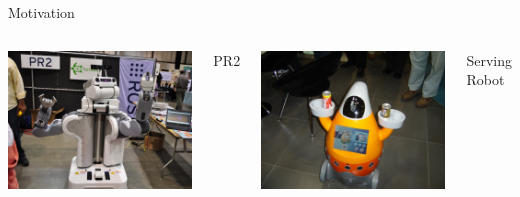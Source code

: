 \documentclass[compress]{beamer}
\begin{document}
\begin{frame}{Motivation}

\begin{columns}[t]
  \includegraphics[width=\textwidth]{figures/extra/PR2.jpg}

  \centering
  PR2

  \includegraphics[width=\textwidth]{figures/extra/servingbot.jpg}
  
  \centering
  Serving Robot


\end{columns}
\end{frame}
\end{document}
